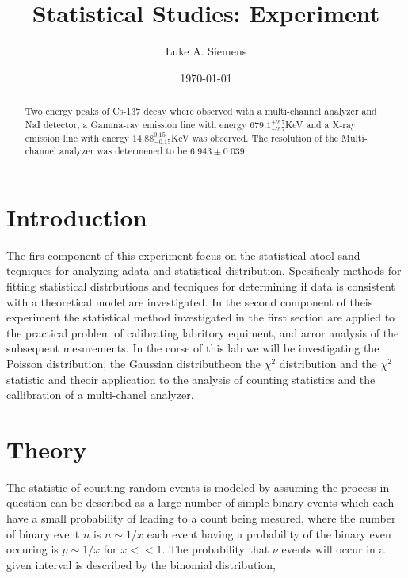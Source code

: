 \documentclass[%
 reprint,
 amsmath,amssymb,
 aps,
]{revtex4-1}
\begin{document}
\title{Statistical Studies: Experiment }%

\author{Luke A. Siemens}

\date{\today}

\begin{abstract}
Two energy peaks of Cs-137 decay where observed with a multi-channel analyzer and NaI detector, a Gamma-ray emission line with energy $679.1_{-2.7}^{+2.7}$KeV and a X-ray emission line with energy $14.88_{-0.15}^{0.15}$KeV was observed. The resolution of the Multi-channel analyzer was determened to be $6.943\pm0.039$.
\end{abstract}

\maketitle

\section{Introduction}

The firs component of this experiment focus on the statistical atool sand teqniques for analyzing adata and statistical distribution. Spesificaly methods for fitting statistical distrbutions and tecniques for determining if data is consistent with a theoretical model are investigated. In the second component of theis experiment the statistical method investigated in the first section are applied to the practical problem of calibrating labritory equiment, and arror analysis of the subsequent mesurements. In the corse of this lab we will be investigating the Poisson distribution, the Gaussian distributheon the $\chi^2$ distribution and the $\chi^2$ statistic and theoir application to the analysis of counting statistics and the callibration of a multi-chanel analyzer.

\section{Theory}
The statistic of counting random events is modeled by assuming the process in question can be described as a large number of simple binary events which each have a small probability of leading to a count being mesured, where the number of binary event $n$ is $n\sim1/x$ each event having a probability of the binary even occuring is $p\sim1/x$ for $x<<1$. The probability that $\nu$ events will occur in a given interval is described by the binomial distribution,
\end{document}
